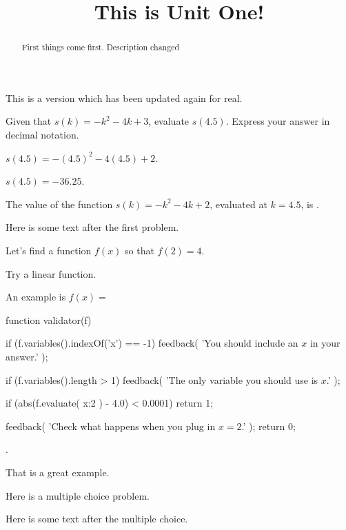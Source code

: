 \documentclass{ximera}
\title{This is Unit One!}
\begin{document}
\begin{abstract}
  First things come first. Description changed
\end{abstract}


This is a version which has been updated again for real.

\begin{exercise}
Given that $s(k)=-k^2-4 k+3$, evaluate $s(4.5)$. Express your answer in decimal notation.
\begin{solution}
\begin{hint}
$s(4.5)=-(4.5)^2-4 (4.5)+2$.
\end{hint}
\begin{hint}
$s(4.5)=-36.25$.
\end{hint}
The value of the function $s(k)=-k^2-4 k+2$, evaluated at $k=4.5$, is .
\end{solution}

Here is some text after the first problem.
\end{exercise}


\begin{exercise}
Let's find a function $f(x)$ so that $f(2) = 4$.

\begin{solution}
\begin{hint}
Try a linear function.
\end{hint}
An example is $f(x) = $ \begin{expression-answer}
  function validator(f) {
    if (f.variables().indexOf('x') == -1) {
      feedback( 'You should include an $x$ in your answer.' );
    }

    if (f.variables().length > 1) {
      feedback( 'The only variable you should use is $x$.' );
    }

    if (abs(f.evaluate( {x:2} ) - 4.0) < 0.0001)
      return 1;

    feedback( 'Check what happens when you plug in $x=2$.' );
    return 0;
  }
\end{expression-answer}.
\end{solution}

That is a great example.
\end{exercise}

\begin{exercise}
  Here is a multiple choice problem.

  \begin{solution}
    \begin{multiple-choice}
    \end{multiple-choice}
  \end{solution}

  Here is some text after the multiple choice.
\end{exercise}
\end{document}
